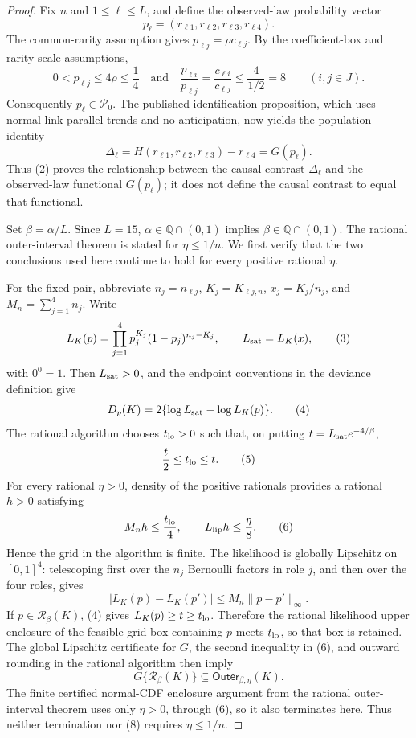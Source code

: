 \documentclass{article}
\begin{document}
\begin{proof}
Fix \(n\) and \(1\leq \ell\leq L\), and define the observed-law probability vector
\[
p_\ell=(r_{\ell1},r_{\ell2},r_{\ell3},r_{\ell4}).
\]
The common-rarity assumption gives \(p_{\ell j}=\rho c_{\ell j}\).  By the coefficient-box and rarity-scale assumptions,
\[
0<p_{\ell j}\leq4\rho\leq\frac14
\quad\text{and}\quad
\frac{p_{\ell i}}{p_{\ell j}}
=\frac{c_{\ell i}}{c_{\ell j}}
\leq\frac4{1/2}=8
\qquad(i,j\in J).
\tag{1}
\]
Consequently \(p_\ell\in\mathcal P_0\).  The published-identification proposition, which uses normal-link parallel trends and no anticipation, now yields the population identity
\[
\Delta_\ell
=H(r_{\ell1},r_{\ell2},r_{\ell3})-r_{\ell4}
=G(p_\ell).
\tag{2}
\]
Thus (2) proves the relationship between the causal contrast \(\Delta_\ell\) and the observed-law functional \(G(p_\ell)\); it does not define the causal contrast to equal that functional.

Set \(\beta=\alpha/L\).  Since \(L=15\), \(\alpha\in\mathbb Q\cap(0,1)\) implies \(\beta\in\mathbb Q\cap(0,1)\).  The rational outer-interval theorem is stated for \(\eta\leq1/n\).  We first verify that the two conclusions used here continue to hold for every positive rational \(\eta\).

For the fixed pair, abbreviate \(n_j=n_{\ell j}\), \(K_j=K_{\ell j,n}\), \(x_j=K_j/n_j\), and \(M_n=\sum_{j=1}^4n_j\).  Write
\[
L_K(p)=\prod_{j=1}^4p_j^{K_j}(1-p_j)^{n_j-K_j},
\qquad
L_{\rm sat}=L_K(x),
\tag{3}
\]
with \(0^0=1\).  Then \(L_{\rm sat}>0\), and the endpoint conventions in the deviance definition give
\[
D_p(K)=2\{\log L_{\rm sat}-\log L_K(p)\}.
\tag{4}
\]
The rational algorithm chooses \(t_{\rm lo}>0\) such that, on putting \(t=L_{\rm sat}e^{-4/\beta}\),
\[
\frac t2\leq t_{\rm lo}\leq t.
\tag{5}
\]
For every rational \(\eta>0\), density of the positive rationals provides a rational \(h>0\) satisfying
\[
M_nh\leq\frac{t_{\rm lo}}4,
\qquad
L_{\rm lip}h\leq\frac\eta8.
\tag{6}
\]
Hence the grid in the algorithm is finite.  The likelihood is globally Lipschitz on \([0,1]^4\): telescoping first over the \(n_j\) Bernoulli factors in role \(j\), and then over the four roles, gives
\[
|L_K(p)-L_K(p')|
\leq M_n\lVert p-p'\rVert_\infty.
\tag{7}
\]
If \(p\in\mathcal R_\beta(K)\), (4) gives \(L_K(p)\geq t\geq t_{\rm lo}\).  Therefore the rational likelihood upper enclosure of the feasible grid box containing \(p\) meets \(t_{\rm lo}\), so that box is retained.  The global Lipschitz certificate for \(G\), the second inequality in (6), and outward rounding in the rational algorithm then imply
\[
G\{\mathcal R_\beta(K)\}
\subseteq \mathsf{Outer}_{\beta,\eta}(K).
\tag{8}
\]
The finite certified normal-CDF enclosure argument from the rational outer-interval theorem uses only \(\eta>0\), through (6), so it also terminates here.  Thus neither termination nor (8) requires \(\eta\leq1/n\).


\end{proof}
\end{document}
